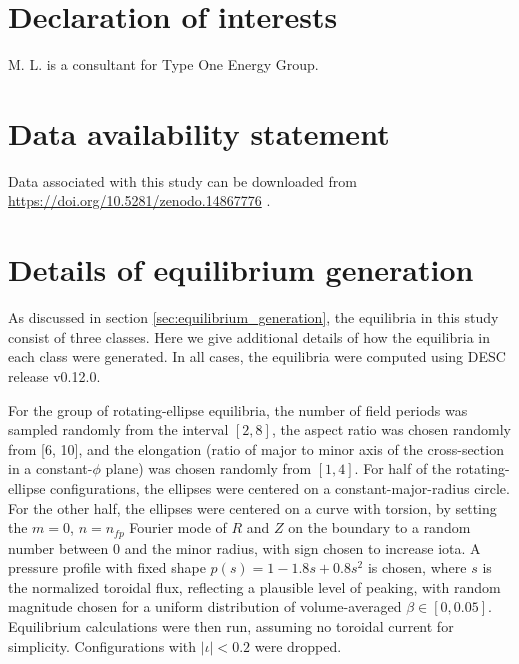 \documentclass{jpp}
\begin{document}
\section*{Declaration of interests}
M. L. is a consultant for Type One Energy Group.

\section*{Data availability statement}
Data associated with this study can be downloaded from \url{https://doi.org/10.5281/zenodo.14867776} \citep{zenodo}.


\appendix

\section{Details of equilibrium generation}
\label{app:equilibrium_details}

As discussed in section \ref{sec:equilibrium_generation}, the equilibria in this study consist of three classes.
Here we give additional details of how the equilibria in each class were generated.
In all cases, the equilibria were computed using  DESC \citep{dudt2020desc} release v0.12.0.

For the group of rotating-ellipse equilibria, the number of field periods was sampled randomly from  the interval $[2, 8]$, the aspect ratio was chosen randomly from [6, 10], and the elongation (ratio of major to minor axis of the cross-section in a constant-$\phi$ plane) was chosen randomly from $[1, 4]$.
For half of the rotating-ellipse configurations, the ellipses were centered on a constant-major-radius circle.
For the other half, the ellipses were centered on a curve with torsion, by setting the $m=0$, $n=n_{fp}$ Fourier mode of $R$ and $Z$ on the boundary to a random number between 0 and the minor radius, with sign chosen to increase iota.
A pressure profile with fixed shape $p(s) = 1-1.8s+0.8 s^2$ is chosen, where $s$ is the normalized toroidal flux, reflecting a plausible level of peaking, with random magnitude chosen for a uniform distribution of volume-averaged $\beta \in [0, 0.05]$.
Equilibrium calculations were then run, assuming no toroidal current for simplicity.
Configurations with $|\iota| < 0.2$ were dropped.
\end{document}
